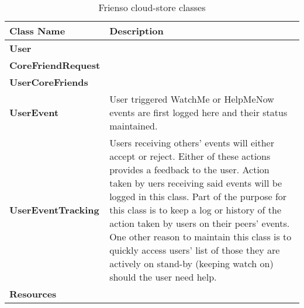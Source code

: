   \begin{table}[ht!]%
	\caption{Frienso cloud-store classes \label{tab:table_label}}
	\begin{tabularx}{\linewidth}{ l X }
	\textbf{Class Name} & \textbf{Description} \\\hline
	\textbf{User} &  \\
	\textbf{CoreFriendRequest} & \\
	\textbf{UserCoreFriends} & \\
	\textbf{UserEvent} & User triggered WatchMe or HelpMeNow events are first logged here and their status maintained.\\
	\textbf{UserEventTracking} & Users receiving others' events will either accept or reject.  Either of these actions provides a feedback to the user. Action taken by uers receiving said events will be logged in this class.  Part of the purpose for this class is to keep a log or history of the action taken by users on their peers' events.  One other reason to maintain this class is to quickly access users' list of those they are actively on stand-by (keeping watch on) should the user need help.\\
	\textbf{Resources} & \\
	\end{tabularx}
	\end{table}%
  
  

